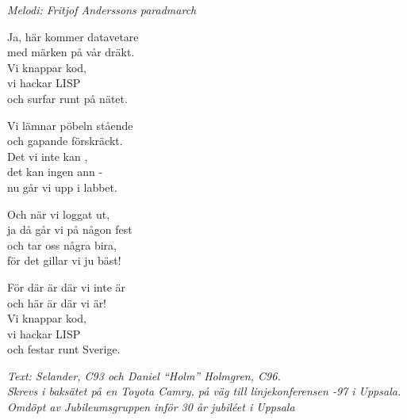 {\footnotesize\textit{Melodi: Fritjof Anderssons paradmarch}}\par
\vspace{10pt}
Ja, här kommer datavetare\\
med märken på vår dräkt.\\
Vi knappar kod, \\
vi hackar LISP\\
och surfar runt på nätet.\par
\vspace{10pt}
Vi lämnar pöbeln stående\\
och gapande förskräckt.\\
Det vi inte kan , \\
det kan ingen ann -\\
nu går vi upp i labbet.\par
\vspace{10pt}
Och när vi loggat ut,\\
ja då går vi på någon fest\\
och tar oss några bira,\\
för det gillar vi ju bäst!\par
\vspace{10pt}
För där är där vi inte är\\
och här är där vi är!\\
Vi knappar kod,\\
vi hackar LISP\\
och festar runt Sverige.\par
\vspace{10pt}
{\footnotesize\textit{Text: Selander, C93 och Daniel ``Holm''
    Holmgren, C96.\\ Skrevs i baksätet på en Toyota Camry, på väg
    till linjekonferensen -97 i Uppsala. Omdöpt av Jubileumsgruppen
    inför 30 år jubiléet i Uppsala}}
